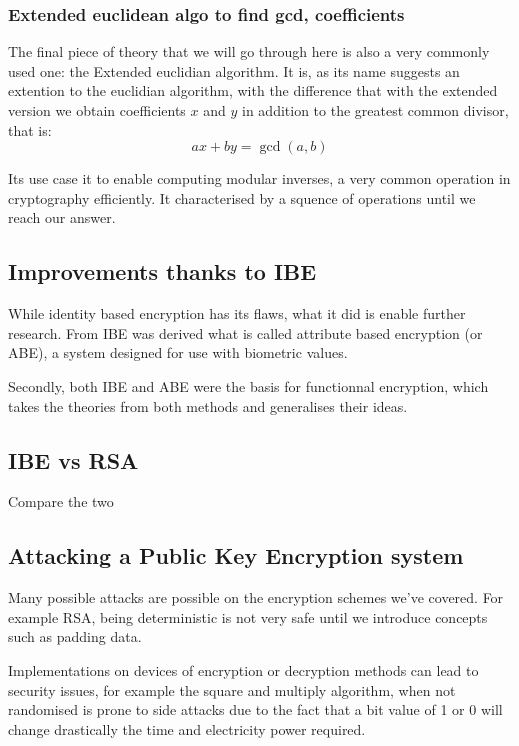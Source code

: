 \documentclass[conference]{IEEEtran}
\begin{document}
\subsubsection{Extended euclidean algo to find gcd, coefficients}
The final piece of theory that we will go through here is also a very
commonly used one: the Extended euclidian algorithm. It is, 
as its name suggests an extention to the euclidian algorithm, with 
the difference that with the extended version we obtain coefficients 
$x$ and $y$ in addition to the greatest common divisor, that is:
\begin{equation*}
    ax + by = \gcd(a,b)
\end{equation*}

Its use case it to enable computing modular inverses, a very common operation in 
cryptography efficiently. It characterised by a squence of operations until we reach
our answer.

\subsection{Improvements thanks to IBE}
While identity based encryption has its flaws, what it did 
is enable further research. From IBE was derived what is called
attribute based encryption (or ABE), a system designed 
for use with biometric values.


Secondly, both IBE and ABE were the basis for functionnal encryption, 
which takes the theories from both methods and generalises their ideas.

\subsection{IBE vs RSA}
Compare the two


\subsection{Attacking a Public Key Encryption system}
Many possible attacks are possible on the encryption schemes we've covered.
For example RSA, being deterministic is not very safe until we introduce concepts such as 
padding data. 

Implementations on devices of encryption or decryption methods 
can lead to security issues, for example the square and multiply algorithm,
when not randomised is prone to side attacks due to the fact that a bit value of 1 or 0 
will change drastically the time and electricity power required.
\end{document}
